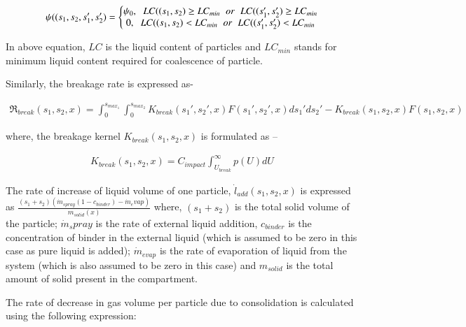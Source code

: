 \documentclass[preprint,11pt,authoryear]{elsarticle}
\begin{document}
	    \begin{align}
	    \psi((s_1,s_2,s_1',s_2') = 
	    \left\{\begin{matrix}
	    \psi_0,\hspace{0.2cm} LC((s_1,s_2) \geq LC_{min}\hspace{0.2cm} or\hspace{0.2cm} LC((s_1',s_2') \geq LC_{min}	\\ 
	    0,\hspace{0.2cm} LC((s_1,s_2) < LC_{min}\hspace{0.2cm} or\hspace{0.2cm} LC((s_1',s_2') < LC_{min}
	    \end{matrix}\right.
	    \end{align}
	    \par In above equation, $LC$ is the liquid content of particles and $LC_{min}$ stands for minimum liquid content required for coalescence of particle.  
	    \par Similarly, the breakage rate is expressed as-
	
	    \begin{align}
	    \Re_{break}(s_1,s_2,x) = \int_0^{s_{max_1}} \int_0^{s_{max_2}} K_{break}(s_1',s_2',x)F(s_1',s_2',x)ds_1'ds_2' - K_{break}(s_1,s_2,x)F(s_1,s_2,x)
	    \end{align}
	    
	    \par where, the breakage kernel $K_{break}(s_1,s_2,x)$ is formulated as – 
	    
	    \begin{align}
	    K_{break}(s_1,s_2,x) = C_{impact}\int_{U_{break}}^{\infty}p(U)dU
	    \end{align}
	
	      \par The rate of increase of liquid volume of one particle, $\dot{l}_{add}(s_1,s_2,x)$ is expressed as $\frac{(s_1+s_2)(\dot{m}_{spray}(1-c_{binder})-\dot{m}_evap)}{m_{solid}(x)}$ where, $(s_1+s_2)$  is the total solid volume of the particle; $\dot{m}_spray$ is the rate of external liquid addition, $c_{binder}$ is the concentration of binder in the external liquid (which is assumed to be zero in this case as pure liquid is added); $\dot{m}_{evap}$ is the rate of evaporation of liquid from the system (which is also assumed to be zero in this case) and $m_{solid}$ is the total amount of solid present in the compartment.
	      \par The rate of decrease in gas volume per particle due to consolidation is calculated using the following expression: 
	      
\end{document}
